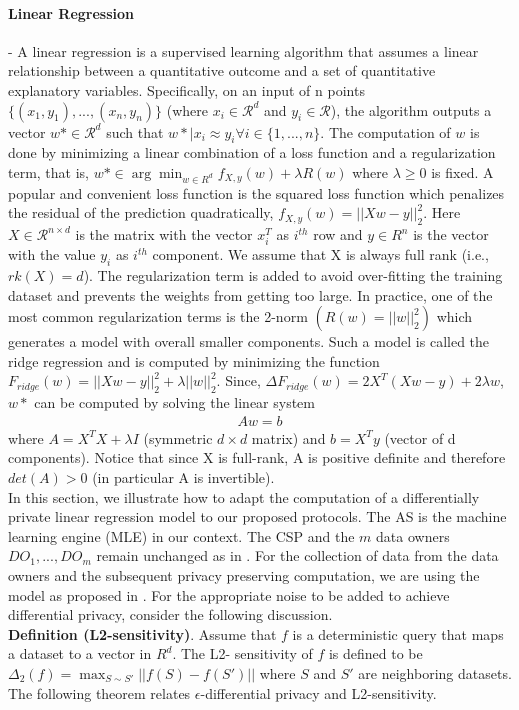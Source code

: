 \paragraph{\textbf{Linear Regression}}-
A linear regression is a supervised learning algorithm  that assumes a linear relationship between a quantitative outcome and a set of quantitative explanatory variables. Specifically, on an input of
n points $\{(x_1, y_1), ... , (x_n , y_n)\}$ (where $x_i \in \mathcal{R}^d 
$ and $y_i \in \mathcal{R} $), the algorithm outputs a vector $w* \in \mathcal{R}^d
$
such that $w*|
x_i \approx y_i \forall i \in \{1,...,n\}$. The computation of $w$ is done by minimizing a linear combination of a loss function and a regularization term, that
is, $w* \in \arg\min_{w \in R^d} f_{X,y}(w) + \lambda R(w) $ where $\lambda \geq 0$ is fixed. A popular and convenient loss function is the squared loss function  which penalizes the
residual of the prediction quadratically, $f_{X,y}(w)=||Xw-y||_2^2$. Here $X \in \mathcal{R}^{n\times d}$
is the matrix with the vector $x^T_i$ as $i^{th}$ row and $y \in R^n$
is the vector with the value $y_i$ as $i^{th}$ component. We assume
that X is always full rank (i.e., $rk(X)=d$). The regularization term is
added to avoid over-fitting the training dataset and  prevents the weights from getting too large. In
practice, one of the most common regularization terms is the 2-norm $(R(w)=||w||_2^2)$ which
generates a model with overall smaller components. Such a model is called the ridge regression and is computed by minimizing the function $F_{ridge}(w)=||Xw - y||_2^2+ \lambda ||w||_2^2$. Since,
$\Delta F_{ridge}(w) =2X^T(Xw - y) + 2\lambda w$,  $w*$
can be computed by solving the linear system
\begin{gather}Aw =b \end{gather}
where $A=X^TX + \lambda I$ (symmetric $d \times d$ matrix) and $b= X^Ty$ (vector of d components).
Notice that since X is full-rank, A is positive definite and therefore $det(A) > 0$ (in particular
A is invertible).
\\ In this section, we illustrate how to adapt the computation of a differentially private linear regression model to our proposed protocols. The AS is the machine learning engine (MLE) in our context. The CSP and the $m$ data owners $ DO_1,... , DO_m$ remain unchanged
 as in \cite{LReg}. For the collection of data from the data owners and the subsequent privacy preserving computation, we are using the model as proposed in \cite{LReg}. For the appropriate noise to be added to achieve differential privacy, consider the following discussion.\\
\textbf{Definition  (L2-sensitivity)}. Assume that  $f$ is a deterministic query that maps a dataset to a vector in $R^d$. The L2-
sensitivity of $f$ is defined to be $\Delta_2(f ) = \max_{S\sim S'}
||f (S) - f (S')||$ where $S$ and $S'$ are neighboring datasets.
The following theorem relates $\epsilon$-differential privacy and L2-sensitivity.

